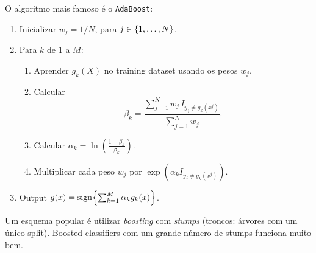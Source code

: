 \documentclass[a4paper,fleqn,12pt]{article}
\begin{document}
O algoritmo mais famoso é o \texttt{AdaBoost}:
\begin{enumerate}
\item Inicializar $w_j = 1/N$, para $j \in \qty{1,\ldots,N}$.
\item Para $k$ de $1$ a $M$:
\begin{enumerate}
\item Aprender $g_k(X)$ no training dataset usando os pesos $w_j$.
\item Calcular
$$
\beta_k = \frac{\sum_{j=1}^{N} w_j \, I_{y_j \neq g_k(x^j)}}{\sum_{j=1}^{N} w_j}.
$$
\item Calcular $\alpha_k = \ln(\frac{1-\beta_k}{\beta_k})$.
\item Multiplicar cada peso $w_j$ por $\exp(\alpha_k I_{y_j \neq g_k(x^j)})$.
\end{enumerate}
\item Output $g(x) = \text{sign}\qty{\sum_{k=1}^{M} \alpha_k g_k(x)}$.
\end{enumerate}

Um esquema popular é utilizar \textit{boosting} com \textit{stumps} (troncos: árvores com um único split). Boosted classifiers com um grande número de stumps funciona muito bem.
\end{document}
